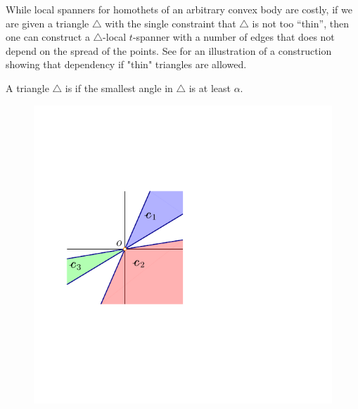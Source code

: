 While local spanners for homothets of an arbitrary convex body are
costly, if we are given a triangle $\triangle$ with the single
constraint that $\triangle$ is not too ``thin'', then one can
construct a $\triangle$-local $t$-spanner with a number of edges that
does not depend on the spread of the points. See 
for an illustration of a construction showing that dependency if
"thin" triangles are allowed.



\begin{defn}
    A triangle $\triangle$ is  if the smallest
    angle in $\triangle$ is at least $\alpha$.
\end{defn}


\begin{figure}[t]
    \centering \phantom{}%
    \hfill%
    \includegraphics[page=1]{../figs/triangle_cones}%
    \hfill%

\end{figure}

